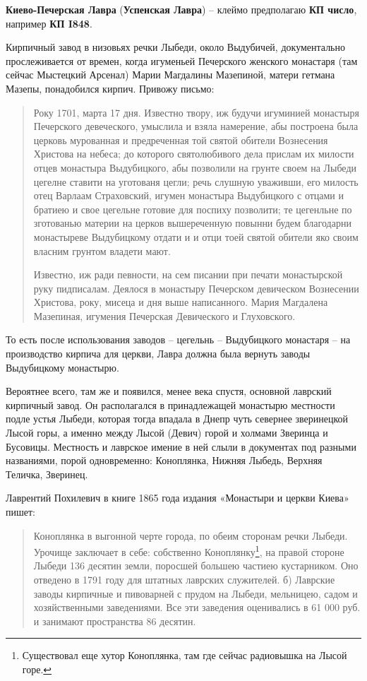 \noindent\textbf{Киево-Печерская Лавра} (\textbf{Успенская Лавра}) – клеймо предполагаю \textbf{КП число}, например \textbf{КП I848}.

Кирпичный завод в низовьях речки Лыбеди, около Выдубичей, документально прослеживается от времен, когда игуменьей Печерского женского монастаря (там сейчас Мыстецкий Арсенал) Марии Магдалины Мазепиной, матери гетмана Мазепы, понадобился кирпич. Привожу письмо:

\begin{quotation}
Року 1701, марта 17 дня. Известно твору, иж будучи игуминией монастыря Печерского девеческого, умыслила и взяла намерение, абы построена была церковь мурованная и предреченная той святой обители Вознесения Христова на небеса; до которого святолюбивого дела прислам их милости отцев монастыра Выдубицкого, абы позволили на грунте своем на Лыбеди цегелне ставити на уготованя цегли; речь слушную уваживши, его милость отец Варлаам Страховский, игумен монастыра Выдубицкого с отцами и братиею и свое цегельне готовие для поспиху позволити; те цегенльне по зготованью материи на церков вышереченную повынни будем благодарни монастыреве Выдубицкому отдати и и отци тоей святой обители яко своим власним грунтом владети мают. 

Известно, иж ради певности, на сем писании при печати монастырской руку пидписалам. Деялося в монастыру Печерском девическом Вознесении Христова, року, мисеца и дня выше написанного. Мария Магдалена Мазепиная, игумения Печерская Девического и Глуховского.\end{quotation}

То есть после использования заводов – цегельнь – Выдубицкого монастаря – на производство кирпича для церкви, Лавра должна была вернуть заводы Выдубицкому монастырю. 

Вероятнее всего, там же и появился, менее века спустя, основной лаврский кирпичный завод. Он располагался в принадлежащей монастырю местности подле устья Лыбеди, которая тогда впадала в Днепр чуть севернее зверинецкой Лысой горы, а именно между Лысой (Девич) горой и холмами Зверинца и Бусовицы. Местность и лаврское имение в ней слыли в документах под разными названиями, порой одновременно: Коноплянка, Нижняя Лыбедь, Верхняя Теличка, Зверинец.

Лаврентий Похилевич в книге 1865 года издания «Монастыри и церкви Киева»\cite{pohilmon} пишет:

\begin{quotation}
Коноплянка в выгонной черте города, по обеим сторонам речки Лыбеди. Урочище заключает в себе: собственно Коноплянку\footnote{Существовал еще хутор Коноплянка, там где сейчас радиовышка на Лысой горе.}, на правой стороне Лыбеди 136 десятин земли, поросшей большею частиею кустарником. Оно отведено в 1791 году для штатных лаврских служителей. б) Лаврские заводы кирпичные и пивоварней с прудом на Лыбеди, мельницею, садом и хозяйственными заведениями. Все эти заведения оценивались в 61 000 руб. и занимают пространства 86 десятин.
\end {quotation}

